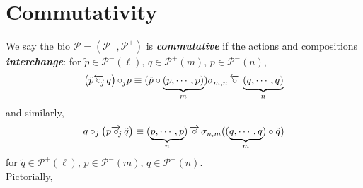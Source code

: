 \documentclass[leqno]{article}
\newcommand{\myemph}[1]{{\it{\bf{#1}}}}
\newcommand{\biop}{\mathscr{P}}
\newcommand{\circleftarrow}{\,\overleftarrow{\circ}\,}
\newcommand{\circrightarrow}{\,\overrightarrow{\circ}\,}
\numberwithin{equation}{section}
\begin{document}
\section{Commutativity} \label{sec:4}
We say the bio $\biop=(\biop^{-},\biop^{+})$ is \myemph{commutative} if the actions and
compositions \myemph{interchange}:
for $\tilde{p}\in\biop^{-}(\ell)$, $q\in \biop^{+}(m)$,
$p\in \biop^{-}(n)$, 
\begin{equation}
				\left( \tilde{p} \overleftarrow{\circ}_{\hspace{-1mm}j}\,q 
				\right){\circ}_{j} p\equiv ( \tilde{p} \circ
								\underbrace{(p,\cdots, p)}_{m})
								\sigma_{m,n}\circleftarrow \underbrace{\left( q,\cdots ,
								q \right)}_{n}
								\label{eq:4.1}
\end{equation}
and similarly,
\begin{equation}
				q \circ_{j} \left( p \overrightarrow{\circ}_{\hspace{-1mm}j}\, \tilde{q} \right) \equiv
				(\underbrace{p,\cdots , p}_{n}) \circrightarrow
				\sigma_{n,m} ( (\underbrace{q,\cdots ,
				q}_{m})\circ \tilde{q})
				\label{eq:4.2}
\end{equation}
for $\tilde{q}\in \biop^{+}(\ell)$, $p\in \biop^{-}(m)$, $q\in
\biop^{+}(n)$. \\
Pictorially, 
\end{document}
